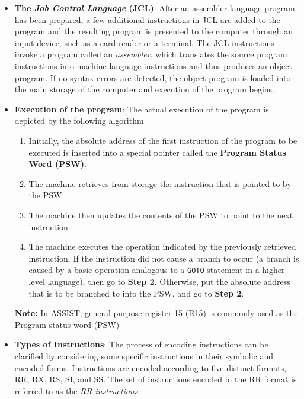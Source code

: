 \documentclass{report}
\begin{document}
\begin{itemize}
\begin{itemize}
                \item \textbf{The \textit{Job Control Language} (JCL)}: After an assembler language program has been prepared, a few additional instructions in JCL are added to the program and the resulting program is presented to the computer through an input device, such as a card reader or a terminal. The JCL instructions invoke a program called an \textit{assembler}, which translates the source program instructions into machine-language instructions and thus produces an object program.
                    \bigbreak \noindent 
                    If no syntax errors are detected, the object program is loaded into the main storage of the computer and execution of the program begins.
                \item \textbf{Execution of the program}: The actual execution of the program is depicted by the following algorithm
                    \begin{enumerate}
                         \item Initially, the absolute address of the first instruction of the program to be executed is inserted into a special pointer called the \textbf{Program Status Word (PSW)}.
                         \item The machine retrieves from storage the instruction that is pointed to by the PSW.
                         \item The machine then updates the contents of the PSW to point to the next instruction.
                         \item The machine executes the operation indicated by the previously retrieved instruction. If the instruction did not cause a branch to occur (a branch is caused by a basic operation analogous to a \texttt{GOTO} statement in a higher-level language), then go to \textbf{Step 2}. Otherwise, put the absolute address that is to be branched to into the PSW, and go to \textbf{Step 2}.
                    \end{enumerate}
                    \bigbreak \noindent 
                    \textbf{Note:} In ASSIST, general purpose register 15 (R15) is commonly used as the Program status word (PSW)
                \item \textbf{Types of Instructions}: The process of encoding instructions can be clarified by considering some specific instructions in their symbolic and encoded forms. Instructions are encoded according to five distinct formats, RR, RX, RS, SI, and SS. The set of instructions encoded in the RR format is referred to as the \textit{RR instructions}.

\end{itemize}
\end{itemize}
\end{document}
